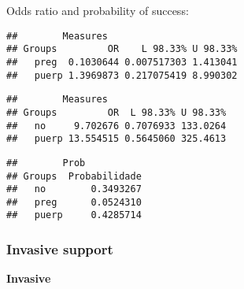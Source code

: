 \documentclass[
]{article}
\newenvironment{Shaded}{\begin{snugshade}}{\end{snugshade}}
\newcommand{\CommentTok}[1]{\textcolor[rgb]{0.56,0.35,0.01}{\textit{#1}}}
\newcommand{\KeywordTok}[1]{\textcolor[rgb]{0.13,0.29,0.53}{\textbf{#1}}}
\newcommand{\NormalTok}[1]{#1}
\newcommand{\OperatorTok}[1]{\textcolor[rgb]{0.81,0.36,0.00}{\textbf{#1}}}
\newcommand{\StringTok}[1]{\textcolor[rgb]{0.31,0.60,0.02}{#1}}
\begin{document}
Odds ratio and probability of success:

\begin{Shaded}
\end{Shaded}

\begin{verbatim}
##        Measures
## Groups         OR    L 98.33% U 98.33%
##   preg  0.1030644 0.007517303 1.413041
##   puerp 1.3969873 0.217075419 8.990302
\end{verbatim}

\begin{Shaded}
\end{Shaded}

\begin{verbatim}
##        Measures
## Groups         OR  L 98.33% U 98.33%
##   no     9.702676 0.7076933 133.0264
##   puerp 13.554515 0.5645060 325.4613
\end{verbatim}

\begin{Shaded}
\end{Shaded}

\begin{verbatim}
##        Prob
## Groups  Probabilidade
##   no        0.3493267
##   preg      0.0524310
##   puerp     0.4285714
\end{verbatim}

\hypertarget{invasive-support-1}{%
\subsubsection{Invasive support}\label{invasive-support-1}}

\textbf{Invasive}

\begin{Shaded}
\end{Shaded}
\end{document}

